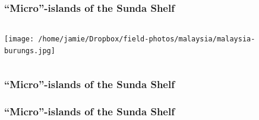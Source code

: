 \begin{frame}
    \frametitle{``Micro''-islands of the Sunda Shelf}
    \vspace{-2mm}
    \begin{columns}
        \column{\dimexpr\paperwidth}
        \texttt{[image: /home/jamie/Dropbox/field-photos/malaysia/malaysia-burungs.jpg]}
    \end{columns}
\end{frame}

{
\begin{frame}
    \frametitle{``Micro''-islands of the Sunda Shelf}
\end{frame}
}

{
\begin{frame}
    \frametitle{``Micro''-islands of the Sunda Shelf}
\end{frame}
}
